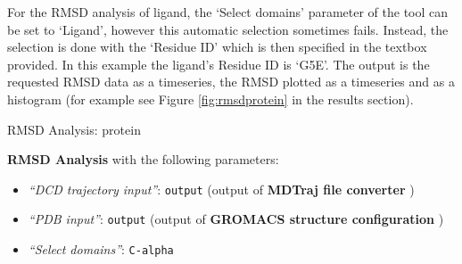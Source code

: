 \documentclass[twocolumn]{bmcart}%
\providecommand{\tightlist}{%
  \setlength{\itemsep}{0pt}\setlength{\parskip}{0pt}}
\begin{document}
For the RMSD analysis of ligand, the `Select domains' parameter of the tool can be set to `Ligand', however this automatic selection sometimes fails. Instead, the selection is done with the `Residue ID' which is then specified in the textbox provided. In this example the ligand's Residue ID is `G5E'. The output is the requested RMSD data as a timeseries, the RMSD plotted as a timeseries and as a histogram (for example see Figure \ref{fig:rmsdprotein} in the results section).

\begin{handson_box_colour}{RMSD Analysis: protein}

  \textbf{RMSD Analysis} with the following parameters:

  \begin{itemize}
  \tightlist
    \item
    \emph{``DCD trajectory input''}: \texttt{output} (output of
    \textbf{MDTraj file converter} )
  \item
    \emph{``PDB input''}: \texttt{output} (output of \textbf{GROMACS
    structure configuration} )
  \item
    \emph{``Select domains''}: \texttt{C-alpha}
  \end{itemize}

\end{handson_box_colour}


\end{document}
